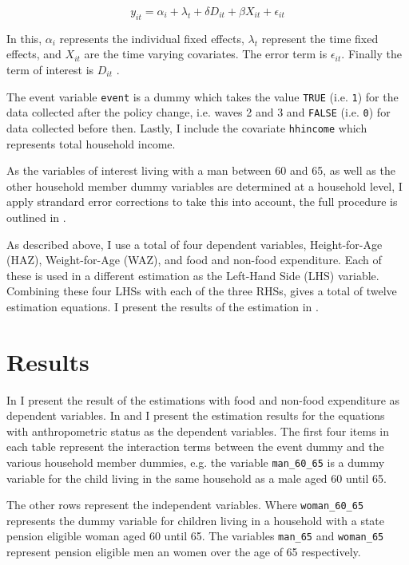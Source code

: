 \documentclass[a4paper,british]{article}\usepackage[]{graphicx}\usepackage[]{color}
\newcommand{\code}[1]{\texttt{#1}}
\begin{document}
\begin{equation}
y_{it}=\alpha_{i}+\lambda_{t}+\delta D{}_{it}+\beta X_{it}+\epsilon_{it}\label{eq:m1}
\end{equation}

In this, $\alpha_{i}$ represents the individual fixed effects, $\lambda_{t}$
represent the time fixed effects, and $X_{it}$ are the time varying
covariates. The error term is $\epsilon_{it}$. Finally the term of
interest is $D_{it}$ . 

The event variable \code{event} is a dummy which takes the value
\code{TRUE} (i.e. \code{1}) for the data collected after the policy
change, i.e. waves 2 and 3 and \code{FALSE} (i.e. \code{0}) for
data collected before then. Lastly, I include the covariate \code{hhincome}
which represents total household income.

As the variables of interest living with a man between 60 and 65,
as well as the other household member dummy variables are determined
at a household level, I apply strandard error corrections to take
this into account, the full procedure is outlined in .

As described above, I use a total of four dependent variables, Height-for-Age
(HAZ), Weight-for-Age (WAZ), and food and non-food expenditure. Each
of these is used in a different estimation as the Left-Hand Side (LHS)
variable. Combining these four LHSs with each of the three RHSs, gives
a total of twelve estimation equations. I present the results of the
estimation in .

\section{Results}

\label{sec:results} In  I present the result of
the estimations with food and non-food expenditure as dependent variables.
In  and  I present the estimation
results for the equations with anthropometric status as the dependent
variables. The first four items in each table represent the interaction
terms between the event dummy and the various household member dummies,
e.g. the variable \code{man\_60\_65} is a dummy variable for the
child living in the same household as a male aged 60 until 65.

The other rows represent the independent variables. Where \code{woman\_60\_65}
represents the dummy variable for children living in a household with
a state pension eligible woman aged 60 until 65. The variables \code{man\_65}
and \code{woman\_65} represent pension eligible men an women over
the age of 65 respectively. 
\end{document}
